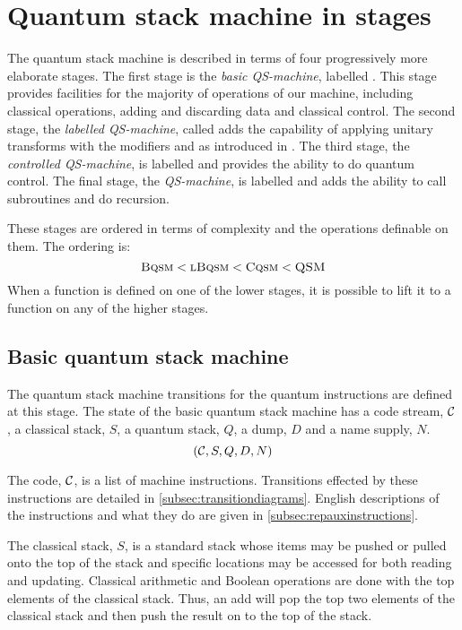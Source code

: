 \section{Quantum stack machine in stages}\label{sec:qsmstate}
The quantum stack machine is described in terms of four 
progressively more elaborate stages. The first stage is
the   \emph{basic QS-machine}, labelled \bms. This stage provides
 facilities for the majority of operations
of our machine, including classical operations, adding and discarding data
 and classical control. The second stage, the \emph{labelled QS-machine},
called \lbms{} adds the capability of applying 
unitary transforms with the modifiers 
 and  as introduced in 
\cite{giles:msc2}. 
The third stage, the  \emph{controlled QS-machine}, is labelled \cms{} and 
provides the
ability to do quantum control. The final stage,  the
\emph{QS-machine}, is labelled \ms{} and 
 adds the ability to call subroutines and do 
recursion.

These stages are ordered in terms of complexity and the
operations definable on them. The ordering is:
\[ \textsc{Bqsm} < \textsc{lBqsm} < \textsc{Cqsm} < \textsc{QSM}\]
When a function is defined on one of the lower stages, it is possible
to lift it to a function on any of the higher stages. 


\subsection{Basic quantum stack machine}\label{subsec:basicmachinestate}

The quantum stack machine transitions for the quantum instructions 
 are defined  at this stage.
The state of the basic quantum stack machine  has a code stream, $\mathcal{C}$, a
classical stack, $S$, a  quantum stack, $Q$, a dump, $D$ and a
name supply, $N$.
\begin{equation}
(\mathcal{C},S,Q,D,N)\label{eq:minimalmachinestate} \\
\end{equation}

The code, $\mathcal{C}$,  is a list of machine instructions. Transitions 
effected by these instructions are detailed in 
 \vref{subsec:transitiondiagrams}. English descriptions of the
instructions and what they do are given in 
 \vref{subsec:repauxinstructions}.


The classical stack, $S$, is a standard stack whose items may
be pushed or pulled onto the top of the stack and specific locations 
may be accessed for both reading and updating.
Classical arithmetic and Boolean operations are done with the top
elements of the classical stack. Thus, an add will pop the
top two elements of the classical stack and then push the result 
 on to the top of the stack.


